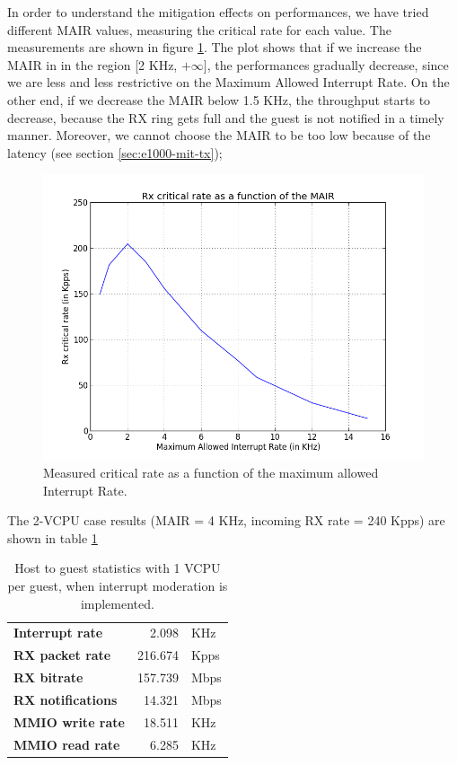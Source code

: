 \vspace{0.5cm}

In order to understand the mitigation effects on performances, we have tried different MAIR values, measuring the critical rate for
each value. The measurements are shown in figure \ref{fig:itr-vs-cr}.
The plot shows that if we increase the MAIR in in the region [2 KHz, $+\infty$], the performances gradually decrease, since we are 
less and less restrictive on the Maximum Allowed Interrupt Rate.
On the other end, if we decrease the MAIR below 1.5 KHz, the throughput starts to decrease, because the RX ring gets full and the guest
is not notified in a timely manner.
Moreover, we cannot choose the MAIR to be too low because of the latency (see section \ref{sec:e1000-mit-tx});

\begin{figure}[bt]
\centering
\includegraphics[scale = 0.7]{MAIR-vs-CR.png}
\caption{Measured critical rate as a function of the maximum allowed Interrupt Rate.}
\label{fig:itr-vs-cr}
\end{figure}


\vspace{0.5cm}

The 2-VCPU case results (MAIR = 4 KHz, incoming RX rate = 240 Kpps) are shown in table \ref{tab:e1000-mit-rx-g2h2vcpu}

\begin{table}
\begin{center}
\begin{tabular}{lrl}
\toprule
\textbf{Interrupt rate} & 2.098 & KHz\\
\textbf{RX packet rate} & 216.674 & Kpps\\
\textbf{RX bitrate} & 157.739 & Mbps\\
\textbf{RX notifications} & 14.321 & Mbps\\
\textbf{MMIO write rate} & 18.511 & KHz\\
\textbf{MMIO read rate} & 6.285 & KHz\\
\bottomrule
\end{tabular}
\end{center}
\caption{Host to guest statistics with 1 VCPU per guest, when interrupt moderation is implemented.}
\label{tab:e1000-mit-rx-g2h2vcpu}
\end{table}


